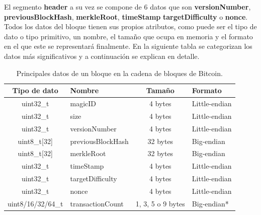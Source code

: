 \documentclass{article}
\begin{document}
    El segmento \textbf{header} a su vez se compone de 6 datos que son \textbf{versionNumber}, \textbf{previousBlockHash}, \textbf{merkleRoot}, \textbf{timeStamp} \textbf{targetDifficulty} o \textbf{nonce}. Todos los datos del bloque tienen sus propios atributos, como puede ser el tipo de dato o tipo primitivo, un nombre, el tamaño que ocupa en memoria y el formato en el que este se representará finalmente. En la siguiente tabla se categorizan los datos más significativos y a continuación se explican en detalle.
    \begin{table}[H]
    \centering
    \begin{tabular}{| c | l | c | l |} 
        \hline
        Tipo de dato & Nombre & Tamaño & Formato \\
        \hline
        uint32\_t & magicID & 4 bytes & Little-endian \\
        \hline
        uint32\_t & size & 4 bytes & Little-endian \\
        \hline
        uint32\_t & versionNumber & 4 bytes & Little-endian \\
        \hline
        uint8\_t[32] & previousBlockHash & 32 bytes & Big-endian \\
        \hline
        uint8\_t[32] & merkleRoot & 32 bytes & Big-endian \\
        \hline
        uint32\_t & timeStamp & 4 bytes & Little-endian \\
        \hline
        uint32\_t & targetDifficulty & 4 bytes & Little-endian \\
        \hline
        uint32\_t & nonce & 4 bytes & Little-endian \\
        \hline
        uint8/16/32/64\_t & transactionCount & 1, 3, 5 o 9 bytes & Big-endian*  \\
        \hline
    \end{tabular}
    \caption{Principales datos de un bloque en la cadena de bloques de Bitcoin.}
    \label{table:0}
    \end{table}
    
\end{document}
